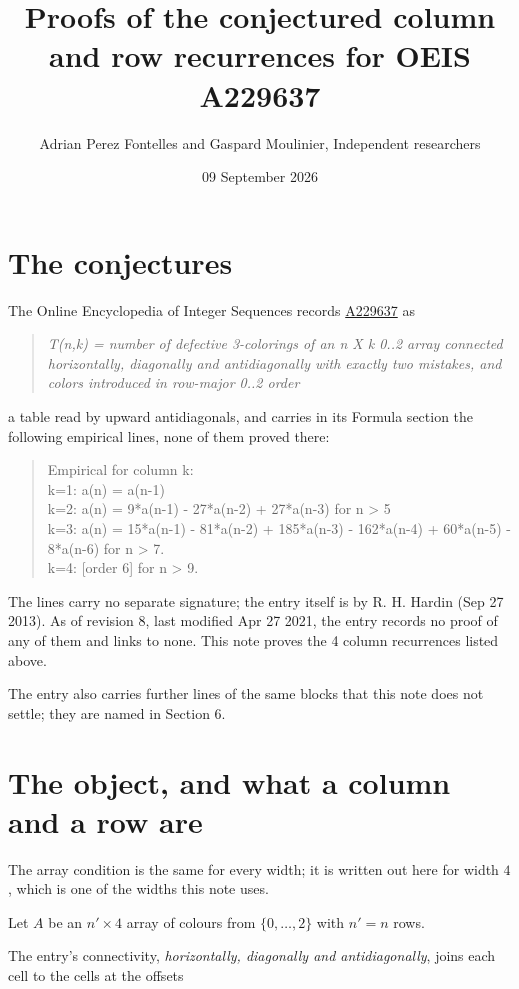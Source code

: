 \documentclass[11pt]{article}
\title{Proofs of the conjectured column and row recurrences for OEIS A229637}
\author{Adrian Perez Fontelles and Gaspard Moulinier, Independent researchers}
\date{09 September 2026}
\theoremstyle{definition}
\begin{document}
\maketitle
\section{The conjectures}

The Online Encyclopedia of Integer Sequences records \href{https://oeis.org/A229637}{A229637} as

\begin{quote}\itshape T(n,k) = number of defective 3-colorings of an n X k 0..2 array connected horizontally, diagonally and antidiagonally with exactly two mistakes, and colors introduced in row-major 0..2 order\end{quote}

a table read by upward antidiagonals, and carries in its Formula section the following empirical lines, none of them proved there:

\begin{quote}\ttfamily Empirical for column k:\\
k=1: a(n) = a(n-1)\\k=2: a(n) = 9*a(n-1) - 27*a(n-2) + 27*a(n-3) for n > 5\\k=3: a(n) = 15*a(n-1) - 81*a(n-2) + 185*a(n-3) - 162*a(n-4) + 60*a(n-5) - 8*a(n-6) for n > 7.\\k=4: [order 6] for n > 9.\end{quote}

The lines carry no separate signature; the entry itself is by R. H. Hardin (Sep 27 2013). As of revision 8, last modified Apr 27 2021, the entry records no proof of any of them and links to none. This note proves the 4 column recurrences listed above.

The entry also carries further lines of the same blocks that this note does not settle; they are named in Section 6.

\section{The object, and what a column and a row are}

The array condition is the same for every width; it is written out here for width $4$, which is one of the widths this note uses.

Let $A$ be an $n' \times 4$ array of colours from $\{0,\dots,2\}$ with $n' = n$ rows.

The entry's connectivity, {\itshape horizontally, diagonally and antidiagonally}, joins each cell to the cells at the offsets
\end{document}
